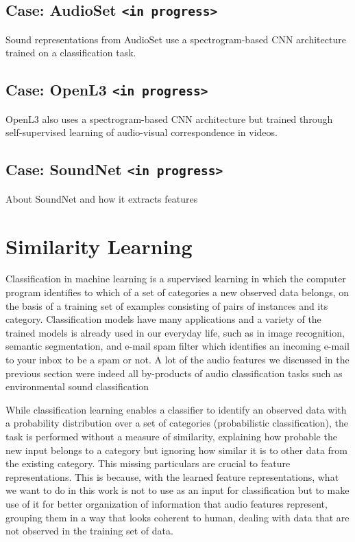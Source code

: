 \subsection{Case: AudioSet \texttt{<in progress>}}
Sound representations  from AudioSet \cite{AudioSet} use a spectrogram-based CNN architecture trained on a classification task.

\subsection{Case: OpenL3 \texttt{<in progress>}}
OpenL3 \cite{OpenL3} also uses a spectrogram-based CNN architecture but trained through self-supervised learning of audio-visual correspondence in videos.

\subsection{Case: SoundNet \texttt{<in progress>}}
About SoundNet and how it extracts features

\section{Similarity Learning}
Classification in machine learning is a supervised learning in which the computer program identifies to which of a set of categories a new observed data belongs, on the basis of a training set of examples consisting of pairs of instances and its category. Classification models have many applications and a variety of the trained models is already used in our everyday life, such as in image recognition, semantic segmentation, and e-mail spam filter which identifies an incoming e-mail to your inbox to be a spam or not. A lot of the audio features we discussed in the previous section were indeed all by-products of audio classification tasks such as environmental sound classification

While classification learning enables a classifier to identify an observed data with a probability distribution over a set of categories (probabilistic classification), the task is performed without a measure of similarity, explaining how probable the new input belongs to a category but ignoring how similar it is to other data from the existing category. This missing particulars are crucial to feature representations. This is because, with the learned feature representations, what we want to do in this work is not to use as an input for classification but to make use of it for better organization of information that audio features represent, grouping them in a way that looks coherent to human, dealing with data that are not observed in the training set of data.

